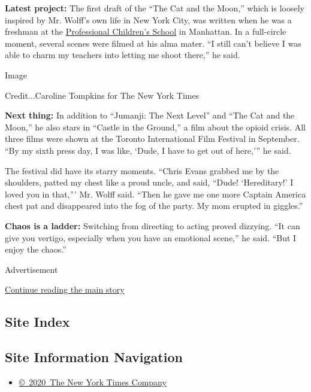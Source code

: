 \textbf{Latest project:} The first draft of the ``The Cat and the
Moon,'' which is loosely inspired by Mr. Wolff's own life in New York
City, was written when he was a freshman at the
\href{https://www.pcs-nyc.org/alumni/distinguished-alumni}{Professional
Children's School} in Manhattan. In a full-circle moment, several scenes
were filmed at his alma mater. ``I still can't believe I was able to
charm my teachers into letting me shoot there,'' he said.

Image

Credit...Caroline Tompkins for The New York Times

\textbf{Next thing:} In addition to ``Jumanji: The Next Level'' and
``The Cat and the Moon,'' he also stars in ``Castle in the Ground,'' a
film about the opioid crisis. All three films were shown at the Toronto
International Film Festival in September. ``By my sixth press day, I was
like, `Dude, I have to get out of here,''' he said.

The festival did have its starry moments. ``Chris Evans grabbed me by
the shoulders, patted my chest like a proud uncle, and said, ``Dude!
`Hereditary!' I loved you in that,''' Mr. Wolff said. ``Then he gave me
one more Captain America chest pat and disappeared into the fog of the
party. My mom erupted in giggles.''

\textbf{Chaos is a ladder:} Switching from directing to acting proved
dizzying. ``It can give you vertigo, especially when you have an
emotional scene,'' he said. ``But I enjoy the chaos.''

Advertisement

\protect\hyperlink{after-bottom}{Continue reading the main story}

\hypertarget{site-index}{%
\subsection{Site Index}\label{site-index}}

\hypertarget{site-information-navigation}{%
\subsection{Site Information
Navigation}\label{site-information-navigation}}

\begin{itemize}
\tightlist
\item
  \href{https://help.nytimes.com/hc/en-us/articles/115014792127-Copyright-notice}{©~2020~The
  New York Times Company}
\end{itemize}

